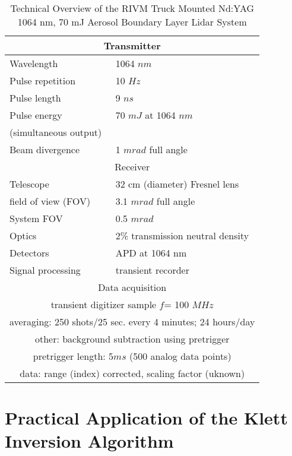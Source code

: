 \begin{table}
\caption{Technical Overview of the
RIVM Truck Mounted Nd:YAG 1064 nm,
70 mJ Aerosol Boundary Layer Lidar System}
\begin{center}
\begin{tabular}{|l|l|}
\hline
\multicolumn{2}{|c|}{Transmitter}\\
\hline
Wavelength & 1064 $nm$ \\
\hline
Pulse repetition & 10 $Hz$ \\
\hline
Pulse length & 9 $ns$ \\
\hline
Pulse energy & 70 $mJ$ at 1064 $nm$ \\
(simultaneous output) &  \\
\hline
Beam divergence & 1 $mrad$ full angle \\
\hline
\multicolumn{2}{|c|}{Receiver}\\
\hline
Telescope & 32 cm (diameter) Fresnel lens \\
field of view (FOV) & 3.1 $mrad$ full angle \\
\hline
System FOV  & 0.5 $mrad$\\
\hline 
Optics & 2\% transmission neutral density \\
\hline
Detectors & APD at 1064 nm \\
\hline
Signal processing & transient recorder \\
\hline
\multicolumn{2}{|c|}{Data acquisition}\\ 
\hline
\multicolumn{2}{|c|}{transient digitizer sample $f$= 100 $MHz$}\\ 
\multicolumn{2}{|c|}{averaging: 250 shots/25 sec. 
every 4 minutes; 24 hours/day}\\ 
\multicolumn{2}{|c|}{other: background subtraction using pretrigger}\\
\multicolumn{2}{|c|}{pretrigger length: 5$ms$ (500 analog data points)}\\ 
\multicolumn{2}{|c|}{data: range (index) corrected, scaling factor (uknown)}\\
\hline
\end{tabular}
\end{center}
\end{table}

\section{Practical Application of the Klett Inversion Algorithm}

